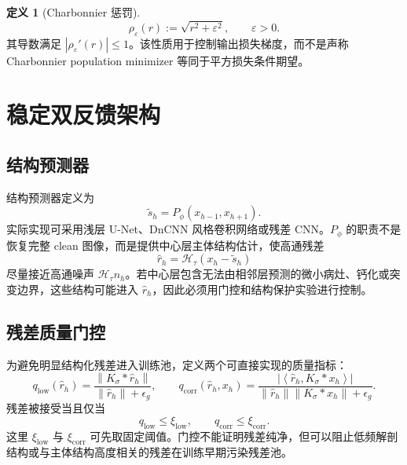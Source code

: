 \documentclass[11pt,a4paper,UTF8,fontset=fandol]{ctexart}
\theoremstyle{definition}
\newtheorem{definition}[theorem]{定义}
\newcommand{\norm}[1]{\left\lVert#1\right\rVert}
\newcommand{\abs}[1]{\left\lvert#1\right\rvert}
\newcommand{\ip}[2]{\left\langle#1,#2\right\rangle}
\newcommand{\cH}{\mathcal{H}}
\begin{document}
\begin{definition}[Charbonnier 惩罚]
\begin{equation}
    \rho_\varepsilon(r):=\sqrt{r^2+\varepsilon^2},
    \qquad
    \varepsilon>0.
\end{equation}
其导数满足 $\abs{\rho_\varepsilon'(r)}\le1$。该性质用于控制输出损失梯度，而不是声称 Charbonnier population minimizer 等同于平方损失条件期望。
\end{definition}

\section{稳定双反馈架构}

\subsection{结构预测器}

结构预测器定义为
\begin{equation}
\label{eq:predictor}
    \tilde s_h=P_\phi(x_{h-1},x_{h+1}).
\end{equation}
实际实现可采用浅层 U-Net、DnCNN 风格卷积网络或残差 CNN。$P_\phi$ 的职责不是恢复完整 clean 图像，而是提供中心层主体结构估计，使高通残差
\begin{equation}
\label{eq:raw-residual}
    \hat r_h=\cH_\tau(x_h-\tilde s_h)
\end{equation}
尽量接近高通噪声 $\cH_\tau n_h$。若中心层包含无法由相邻层预测的微小病灶、钙化或突变边界，这些结构可能进入 $\hat r_h$，因此必须用门控和结构保护实验进行控制。

\subsection{残差质量门控}

为避免明显结构化残差进入训练池，定义两个可直接实现的质量指标：
\begin{equation}
\label{eq:simple-gates}
    q_{\mathrm{low}}(\hat r_h)=
    \frac{\norm{K_\sigma*\hat r_h}}{\norm{\hat r_h}+\epsilon_g},
    \qquad
    q_{\mathrm{corr}}(\hat r_h,x_h)=
    \frac{\abs{\ip{\hat r_h}{K_\sigma*x_h}}}
    {\norm{\hat r_h}\norm{K_\sigma*x_h}+\epsilon_g}.
\end{equation}
残差被接受当且仅当
\begin{equation}
\label{eq:gate-condition}
    q_{\mathrm{low}}\le\xi_{\mathrm{low}},
    \qquad
    q_{\mathrm{corr}}\le\xi_{\mathrm{corr}}.
\end{equation}
这里 $\xi_{\mathrm{low}}$ 与 $\xi_{\mathrm{corr}}$ 可先取固定阈值。门控不能证明残差纯净，但可以阻止低频解剖结构或与主体结构高度相关的残差在训练早期污染残差池。
\end{document}
